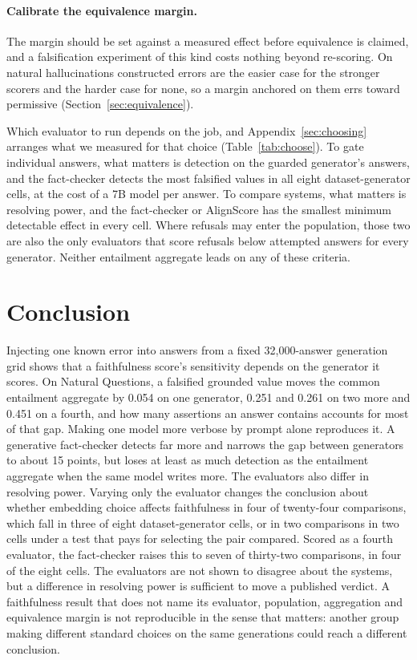 \documentclass[11pt]{article}
\begin{document}
\paragraph{Calibrate the equivalence margin.} The margin should be set against a measured effect before equivalence is claimed, and a falsification experiment of this kind costs nothing beyond re-scoring. On natural hallucinations constructed errors are the easier case for the stronger scorers and the harder case for none, so a margin anchored on them errs toward permissive (Section~\ref{sec:equivalence}).

Which evaluator to run depends on the job, and Appendix~\ref{sec:choosing} arranges what we measured for that choice (Table~\ref{tab:choose}). To gate individual answers, what matters is detection on the guarded generator's answers, and the fact-checker detects the most falsified values in all eight dataset-generator cells, at the cost of a 7B model per answer. To compare systems, what matters is resolving power, and the fact-checker or AlignScore has the smallest minimum detectable effect in every cell. Where refusals may enter the population, those two are also the only evaluators that score refusals below attempted answers for every generator. Neither entailment aggregate leads on any of these criteria.

\section{Conclusion}
\label{sec:conclusion}

Injecting one known error into answers from a fixed 32,000-answer generation grid shows that a faithfulness score's sensitivity depends on the generator it scores. On Natural Questions, a falsified grounded value moves the common entailment aggregate by 0.054 on one generator, 0.251 and 0.261 on two more and 0.451 on a fourth, and how many assertions an answer contains accounts for most of that gap. Making one model more verbose by prompt alone reproduces it. A generative fact-checker detects far more and narrows the gap between generators to about 15 points, but loses at least as much detection as the entailment aggregate when the same model writes more. The evaluators also differ in resolving power. Varying only the evaluator changes the conclusion about whether embedding choice affects faithfulness in four of twenty-four comparisons, which fall in three of eight dataset-generator cells, or in two comparisons in two cells under a test that pays for selecting the pair compared. Scored as a fourth evaluator, the fact-checker raises this to seven of thirty-two comparisons, in four of the eight cells. The evaluators are not shown to disagree about the systems, but a difference in resolving power is sufficient to move a published verdict. A faithfulness result that does not name its evaluator, population, aggregation and equivalence margin is not reproducible in the sense that matters: another group making different standard choices on the same generations could reach a different conclusion.
\end{document}

